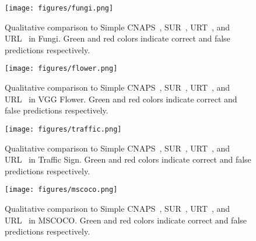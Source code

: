 \begin{figure}[h!]
\begin{center}
\texttt{[image: figures/fungi.png]}
\end{center}
\vspace{-0.3in}
\caption{Qualitative comparison to Simple CNAPS~\cite{bateni2020improved}, SUR~\cite{dvornik2020selecting}, URT~\cite{liu2020universal}, and URL~\cite{li2021universal} in Fungi. Green and red colors indicate correct and false predictions respectively.}
\label{suppfig:fungi}
\end{figure}

\begin{figure}[h!]
\begin{center}
\texttt{[image: figures/flower.png]}
\end{center}
\vspace{-0.3in}
\caption{Qualitative comparison to Simple CNAPS~\cite{bateni2020improved}, SUR~\cite{dvornik2020selecting}, URT~\cite{liu2020universal}, and URL~\cite{li2021universal} in VGG Flower. Green and red colors indicate correct and false predictions respectively.}
\label{suppfig:flower}
\end{figure}

\begin{figure}[h!]
\begin{center}
\texttt{[image: figures/traffic.png]}
\end{center}
\vspace{-0.3in}
\caption{Qualitative comparison to Simple CNAPS~\cite{bateni2020improved}, SUR~\cite{dvornik2020selecting}, URT~\cite{liu2020universal}, and URL~\cite{li2021universal} in Traffic Sign. Green and red colors indicate correct and false predictions respectively.}
\label{suppfig:traffic}
\end{figure}

\begin{figure}[h!]
\begin{center}
\texttt{[image: figures/mscoco.png]}
\end{center}
\vspace{-0.3in}
\caption{Qualitative comparison to Simple CNAPS~\cite{bateni2020improved}, SUR~\cite{dvornik2020selecting}, URT~\cite{liu2020universal}, and URL~\cite{li2021universal} in MSCOCO. Green and red colors indicate correct and false predictions respectively.}
\label{suppfig:mscoco}
\end{figure}

